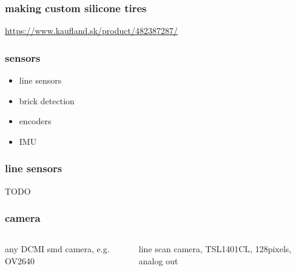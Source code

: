 \documentclass{beamer}
\begin{document}
\begin{frame}
  
  \frametitle{\bf making custom silicone tires}
  \url{https://www.kaufland.sk/product/482387287/}


\end{frame}





\begin{frame}
  
  \frametitle{\bf sensors}

  \begin{itemize}
    \item line sensors
    \item brick detection
    \item encoders
    \item IMU
  \end{itemize}

\end{frame}


\begin{frame}

  \frametitle{\bf line sensors}
  TODO

\end{frame}



\begin{frame}

  \frametitle{\bf camera}
  
  \begin{columns}

    \begin{column}{0.5\textwidth}
      any DCMI smd camera, e.g. OV2640
    \end{column}

    \begin{column}{0.5\textwidth}
      line scan camera, TSL1401CL, 128pixels, analog out
    \end{column}

   
  \end{columns}

\end{frame}
\end{document}
